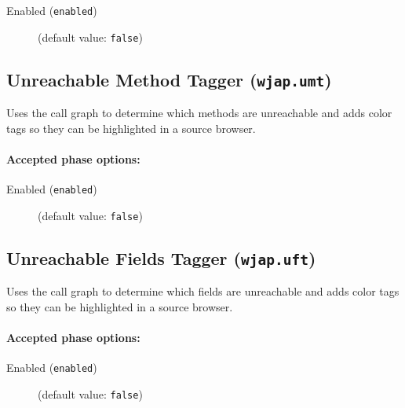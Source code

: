 \documentclass{article}
\begin{document}
\begin{description}

\item[Enabled ({\tt enabled})]
(default value: {\tt false})






\end{description}

\subsection{Unreachable Method Tagger ({\tt wjap.umt})}

\par
Uses the call graph to determine which methods are unreachable and adds color tags so they can be highlighted in a source browser.

\paragraph{Accepted phase options:} 

\begin{description}

\item[Enabled ({\tt enabled})]
(default value: {\tt false})






\end{description}

\subsection{Unreachable Fields Tagger ({\tt wjap.uft})}

\par
Uses the call graph to determine which fields are unreachable and adds color tags so they can be highlighted in a source browser.

\paragraph{Accepted phase options:} 

\begin{description}

\item[Enabled ({\tt enabled})]
(default value: {\tt false})






\end{description}
\end{document}
